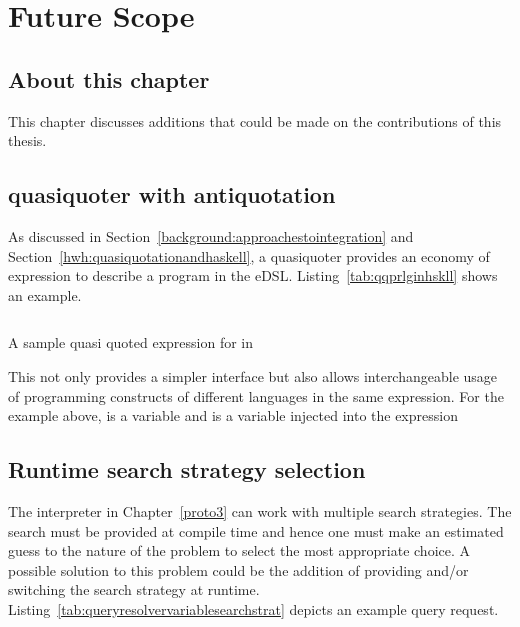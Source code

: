 \documentclass[thesis-solanki.tex]{subfiles}
\begin{document}
\chapter{Future Scope}\label{chap:futureScope}


\section{About this chapter}
This chapter discusses additions that could be made on the contributions of this thesis.


\section{ quasiquoter with antiquotation}
As discussed in Section~\ref{background:approachestointegration} and Section~\ref{hwh:quasiquotationandhaskell}, a quasiquoter provides
an economy of expression to describe a program in the eDSL. Listing~\ref{tab:qqprlginhskll} shows an example.

\begin{code-list}[H]
\begin{singlespace}
\inputminted{haskell}{haskell-proto4-qq-prlg-in-hskll.hs}
\end{singlespace}
\caption{A sample quasi quoted expression for  in }
\label{tab:qqprlginhskll}
\end{code-list}

This not only provides a simpler interface but also allows interchangeable usage of programming constructs of different languages in the 
same expression. For the example above,  is a  variable and  is a 
 variable injected into the expression 

\section{Runtime search strategy selection}
The  interpreter in Chapter~\ref{proto3} can work with multiple search strategies. The search must be provided at compile
time and hence one must make an estimated guess to the nature of the problem to select the most appropriate choice. A possible solution
to this problem could be the addition of providing and/or switching the search strategy at runtime. 
Listing~\ref{tab:queryresolvervariablesearchstrat} depicts an example query request.
\end{document}
